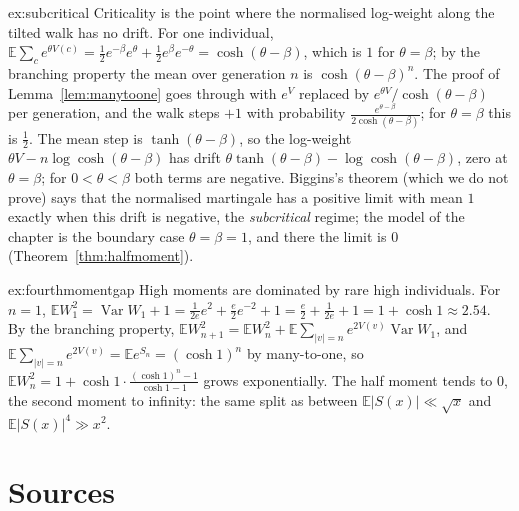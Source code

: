 \begin{solution}{ex:subcritical}
\idea Criticality is the point where the normalised log-weight along the tilted walk has no drift.
\writeup For one individual, $\mathbb E\sum_ce^{\theta V(c)}=\frac12e^{-\beta}e^\theta+\frac12e^\beta e^{-\theta}=\cosh(\theta-\beta)$, which is $1$ for $\theta=\beta$; by the branching property the mean over generation $n$ is $\cosh(\theta-\beta)^n$. The proof of Lemma~\ref{lem:manytoone} goes through with $e^{V}$ replaced by $e^{\theta V}/\cosh(\theta-\beta)$ per generation, and the walk steps $+1$ with probability $\frac{e^{\theta-\beta}}{2\cosh(\theta-\beta)}$; for $\theta=\beta$ this is $\frac12$. The mean step is $\tanh(\theta-\beta)$, so the log-weight $\theta V-n\log\cosh(\theta-\beta)$ has drift $\theta\tanh(\theta-\beta)-\log\cosh(\theta-\beta)$, zero at $\theta=\beta$; for $0<\theta<\beta$ both terms are negative. Biggins's theorem (which we do not prove) says that the normalised martingale has a positive limit with mean $1$ exactly when this drift is negative, the \emph{subcritical} regime; the model of the chapter is the boundary case $\theta=\beta=1$, and there the limit is $0$ (Theorem~\ref{thm:halfmoment}).
\end{solution}

\begin{solution}{ex:fourthmomentgap}
\idea High moments are dominated by rare high individuals.
\writeup For $n=1$, $\mathbb EW_1^2=\operatorname{Var}W_1+1=\frac1{2e}e^2+\frac e2e^{-2}+1=\frac e2+\frac1{2e}+1=1+\cosh1\approx2.54$. By the branching property, $\mathbb EW_{n+1}^2=\mathbb E W_n^2+\mathbb E\sum_{|v|=n}e^{2V(v)}\operatorname{Var}W_1$, and $\mathbb E\sum_{|v|=n}e^{2V(v)}=\mathbb Ee^{S_n}=(\cosh1)^n$ by many-to-one, so $\mathbb EW_n^2=1+\cosh1\cdot\frac{(\cosh1)^n-1}{\cosh1-1}$ grows exponentially. The half moment tends to $0$, the second moment to infinity: the same split as between $\mathbb E|S(x)|\ll\sqrt x$ and $\mathbb E|S(x)|^4\gg x^2$.
\end{solution}

\section{Sources}


